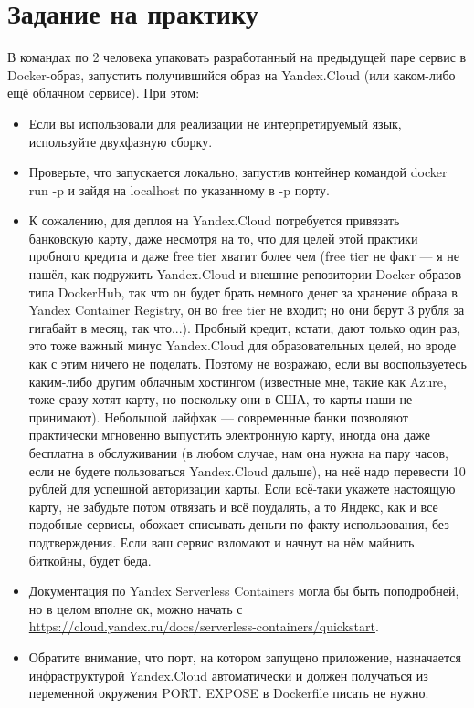 \documentclass{../mcstext}
\begin{document}
\maketitle
\thispagestyle{empty}

\section{Задание на практику}

В командах по 2 человека упаковать разработанный на предыдущей паре сервис в Docker-образ, запустить получившийся образ на Yandex.Cloud (или каком-либо ещё облачном сервисе). При этом: 

\begin{itemize}
    \item Если вы использовали для реализации не интерпретируемый язык, используйте двухфазную сборку.
    \item Проверьте, что запускается локально, запустив контейнер командой docker run -p и зайдя на localhost по указанному в -p порту.
    \item К сожалению, для деплоя на Yandex.Cloud потребуется привязать банковскую карту, даже несмотря на то, что для целей этой практики пробного кредита и даже free tier хватит более чем (free tier не факт --- я не нашёл, как подружить Yandex.Cloud и внешние репозитории Docker-образов типа DockerHub, так что он будет брать немного денег за хранение образа в Yandex Container Registry, он во free tier не входит; но они берут 3 рубля за гигабайт в месяц, так что...). Пробный кредит, кстати, дают только один раз, это тоже важный минус Yandex.Cloud для образовательных целей, но вроде как с этим ничего не поделать. Поэтому не возражаю, если вы воспользуетесь каким-либо другим облачным хостингом (известные мне, такие как Azure, тоже сразу хотят карту, но поскольку они в США, то карты наши не принимают). Небольшой лайфхак --- современные банки позволяют практически мгновенно выпустить электронную карту, иногда она даже бесплатна в обслуживании (в любом случае, нам она нужна на пару часов, если не будете пользоваться Yandex.Cloud дальше), на неё надо перевести 10 рублей для успешной авторизации карты. Если всё-таки укажете настоящую карту, не забудьте потом отвязать и всё поудалять, а то Яндекс, как и все подобные сервисы, обожает списывать деньги по факту использования, без подтверждения. Если ваш сервис взломают и начнут на нём майнить биткойны, будет беда.
    \item Документация по Yandex Serverless Containers могла бы быть поподробней, но в целом вполне ок, можно начать с \url{https://cloud.yandex.ru/docs/serverless-containers/quickstart}.
    \item Обратите внимание, что порт, на котором запущено приложение, назначается инфраструктурой Yandex.Cloud автоматически и должен получаться из переменной окружения PORT. EXPOSE в Dockerfile писать не нужно.
\end{itemize}
\end{document}
